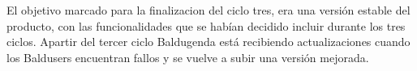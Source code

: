 El objetivo marcado para la finalizacion del ciclo tres, era una versión estable del producto, con las funcionalidades que se habían decidido incluir durante los tres ciclos. Apartir del tercer ciclo Baldugenda está recibiendo actualizaciones cuando los Baldusers encuentran fallos y se vuelve a subir una versión mejorada. 





















